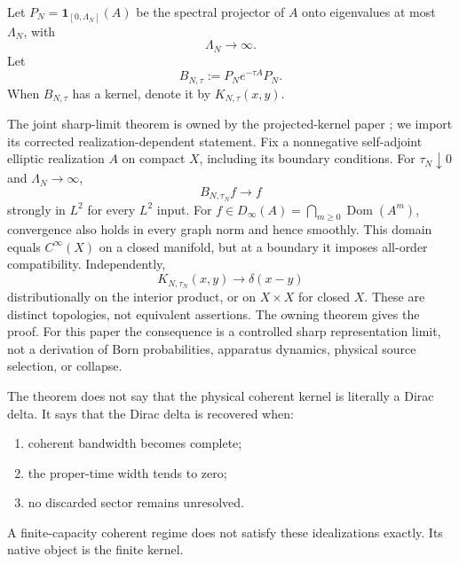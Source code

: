 \documentclass[11pt]{article}
\begin{document}
Let \(P_N=\mathbf 1_{[0,\Lambda_N]}(A)\) be the spectral projector of \(A\) onto eigenvalues
at most \(\Lambda_N\), with
\begin{equation}
  \Lambda_N\to\infty.
\end{equation}
Let
\begin{equation}
  B_{N,\tau}
  :=
  P_N e^{-\tau A}P_N.
  \label{eq:BNtau}
\end{equation}
When \(B_{N,\tau}\) has a kernel, denote it by \(K_{N,\tau}(x,y)\).

\begin{remark}
\label{thm:delta-limit}
The joint sharp-limit theorem is owned by the projected-kernel paper
\cite{MTTKernel}; we import its corrected realization-dependent statement.
Fix a nonnegative self-adjoint elliptic realization \(A\) on compact \(X\),
including its boundary conditions. For \(\tau_N\downarrow0\) and
\(\Lambda_N\to\infty\),
\begin{equation}
  B_{N,\tau_N}f\longrightarrow f
\end{equation}
strongly in \(L^2\) for every \(L^2\) input. For
\(f\in D_\infty(A)=\bigcap_{m\ge0}\operatorname{Dom}(A^m)\), convergence
also holds in every graph norm and hence smoothly. This domain equals
\(C^\infty(X)\) on a closed manifold, but at a boundary it imposes
all-order compatibility. Independently,
\begin{equation}
  K_{N,\tau_N}(x,y)
  \longrightarrow
  \delta(x-y)
\end{equation}
distributionally on the interior product, or on \(X\times X\) for closed
\(X\). These are distinct topologies, not equivalent assertions. The
owning theorem gives the proof. For this paper the consequence is a
controlled sharp representation limit, not a derivation of Born
probabilities, apparatus dynamics, physical source selection, or collapse.
\end{remark}

\begin{remark}
\label{rem:meaning-sharp-limit}
The theorem does not say that the physical coherent kernel is literally a Dirac delta. It says
that the Dirac delta is recovered when:
\begin{enumerate}[label=(\roman*)]
  \item coherent bandwidth becomes complete;
  \item the proper-time width tends to zero;
  \item no discarded sector remains unresolved.
\end{enumerate}
A finite-capacity coherent regime does not satisfy these idealizations exactly. Its native
object is the finite kernel.
\end{remark}
\end{document}
